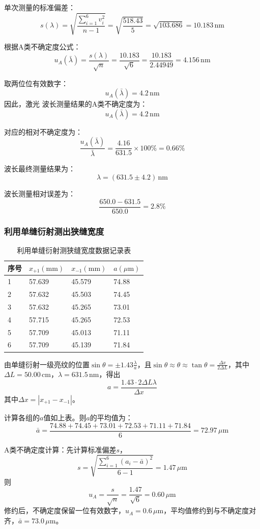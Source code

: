 \documentclass[10pt,a4paper]{ctexart}
\begin{document}
单次测量的标准偏差：
$$ s(\lambda) = \sqrt{\frac{\sum_{i=1}^{6} v_i^2}{n-1}} = \sqrt{\frac{518.43}{5}} = \sqrt{103.686} = 10.183 \, \text{nm} $$


根据A类不确定度公式：
$$ u_A(\bar{\lambda}) = \frac{s(\lambda)}{\sqrt{n}} = \frac{10.183}{\sqrt{6}} = \frac{10.183}{2.44949} = 4.156 \, \text{nm} $$

取两位位有效数字：
$$ u_A(\bar{\lambda}) = 4.2 \, \text{nm} $$
因此，激光
波长测量结果的A类不确定度为：
$$ \boxed{u_A(\bar{\lambda}) = 4.2 \, \text{nm}} $$

对应的相对不确定度为：
$$ \frac{u_A(\bar{\lambda})}{\bar{\lambda}} = \frac{4.16}{631.5} \times 100\% = 0.66\% $$

波长最终测量结果为：
$$ \lambda = (631.5\pm 4.2) \, \text{nm} $$

波长测量相对误差为：
$$ \frac{650.0-631.5}{650.0}=2.8 \% $$

\subsubsection{利用单缝衍射测出狭缝宽度}
\begin{table}[H]
\centering
\caption{利用单缝衍射测狭缝宽度数据记录表}
\label{tab:a}
\begin{tabular}{|l|l|l|l|}
\hline
序号 & $x_{+1}(\mathrm{mm})$ & $x_{-1}(\mathrm{mm})$ & $a(\mu\mathrm{m})$ \\
\hline
1 & 57.639 & 45.579 & 74.88 \\
2 & 57.632 & 45.503 & 74.45 \\
3 & 57.632 & 45.265 & 73.01 \\
4 & 57.715 & 45.265 & 72.53 \\
5 & 57.709 & 45.013 & 71.11 \\
6 & 57.709 & 45.139 & 71.84 \\
\hline
\end{tabular}
\end{table}

由单缝衍射一级亮纹的位置$\sin \theta = \pm 1.43 \frac{\lambda}{a}$，且$\sin \theta \approx \theta \approx \tan \theta = \frac{\Delta x}{2\Delta L}$，其中$\Delta L = 50.00\,\mathrm{cm}$，$\lambda = 631.5\,\mathrm{nm}$，得出
\[
a = \frac{1.43 \cdot 2 \Delta L\lambda}{\Delta x}
\]
其中$\Delta x = |x_{+1} - x_{-1}|$。

计算各组的$a$值如上表。则$a$的平均值为：
\[
\bar{a} = \frac{74.88 + 74.45 + 73.01 + 72.53 + 71.11 + 71.84}{6} = 72.97 \, \mu\mathrm{m}
\]

A类不确定度计算：先计算标准偏差$s$，
\[
s = \sqrt{\frac{\sum_{i=1}^{6} (a_i - \bar{a})^2}{6-1}} = 1.47 \, \mu\mathrm{m}
\]
则
\[
u_A = \frac{s}{\sqrt{n}} = \frac{1.47}{\sqrt{6}} = 0.60 \, \mu\mathrm{m}
\]
修约后，不确定度保留一位有效数字，$u_A = 0.6 \, \mu\mathrm{m}$，平均值修约到与不确定度对齐，$\bar{a} = 73.0 \, \mu\mathrm{m}$。
\end{document}
